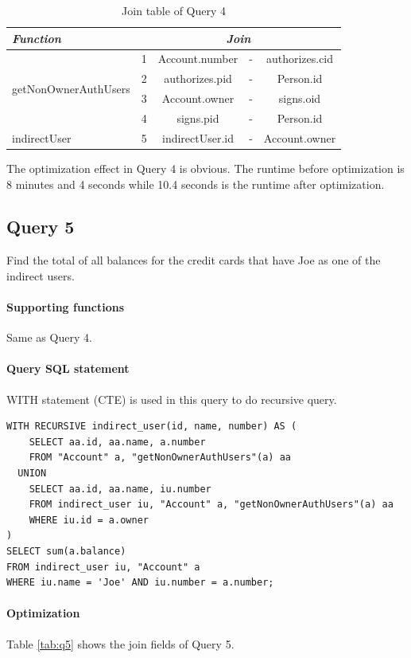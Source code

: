\documentclass[11pt]{article}
\begin{document}
\begin{table}[!htbp]
\centering
\label{tab:q4}
\caption{Join table of Query 4}
\begin{tabular}{|l||r|c|l|c|}
\hline
{\itshape Function} & \multicolumn{4}{c|}{\itshape Join} \\
\hline
\multirow{4}{*}{getNonOwnerAuthUsers} & 1 & Account.number & - & authorizes.cid \\
\cline{2-5}
& 2 & authorizes.pid & - & Person.id \\
\cline{2-5}
& 3 & Account.owner & - & signs.oid \\
\cline{2-5}
& 4 & signs.pid & - & Person.id \\
\hline
indirectUser & 5 & indirectUser.id & - & Account.owner \\
\hline
\end{tabular}
\end{table}

\par
The optimization effect in Query 4 is obvious. The runtime before optimization is 8 minutes and 4 seconds while 10.4 seconds is the runtime after optimization.

\subsection{Query 5}
Find the total of all balances for the credit cards that have Joe as one of the indirect users.

\paragraph{Supporting functions} Same as Query 4.

\paragraph{Query SQL statement} WITH statement (CTE) is used in this query to do recursive query.
\begin{verbatim}
WITH RECURSIVE indirect_user(id, name, number) AS (
    SELECT aa.id, aa.name, a.number
    FROM "Account" a, "getNonOwnerAuthUsers"(a) aa
  UNION
    SELECT aa.id, aa.name, iu.number
    FROM indirect_user iu, "Account" a, "getNonOwnerAuthUsers"(a) aa
    WHERE iu.id = a.owner
)
SELECT sum(a.balance)
FROM indirect_user iu, "Account" a
WHERE iu.name = 'Joe' AND iu.number = a.number;
\end{verbatim}

\paragraph{Optimization} Table \ref{tab:q5} shows the join fields of Query 5.
\end{document}
